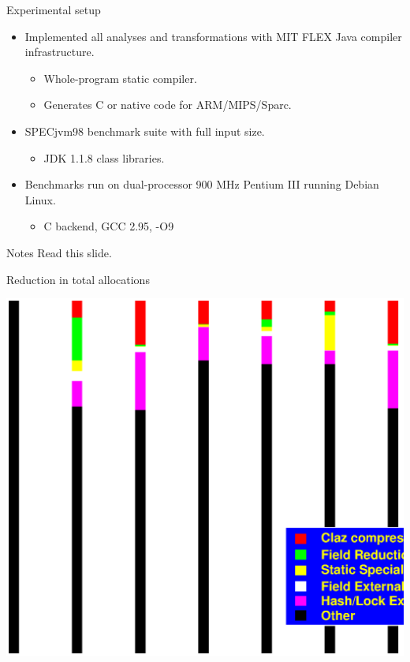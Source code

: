 \documentclass[%
pdf,
colorBG,
slideColor,
nototal,
oqe
]{prosper}
\renewcommand{\yellow}{\colC}
\newenvironment{talknotes}{\begin{slide}{Notes}\tiny}{\end{slide}}
\begin{document}
\begin{slide}{Experimental setup}
\begin{itemize}
\item Implemented all analyses and transformations with
      MIT FLEX Java compiler infrastructure.
\begin{itemize}\yellow
\item Whole-program static compiler.
\item Generates C or native code for ARM/MIPS/Sparc.
\end{itemize}
\item SPECjvm98 benchmark suite with full input size.
\begin{itemize}\yellow
\item JDK 1.1.8 class libraries.
\end{itemize}
\item Benchmarks run on dual-processor 900 MHz
  Pentium III running Debian Linux.
\begin{itemize}\yellow
\item C backend, GCC 2.95, -O9
\end{itemize}
\end{itemize}
\end{slide}

\begin{talknotes}
Read this slide.
\end{talknotes}

\begin{slide}{Reduction in total allocations}
\begin{center}
\includegraphics[scale=0.45]{Figures/oopsla-ttlalloc-color.eps}
\end{center}
\end{slide}
\end{document}
